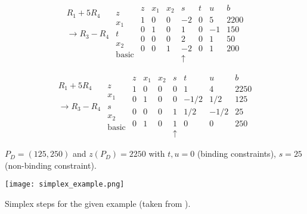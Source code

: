 \documentclass[c]{beamer}
\begin{document}
\begin{frame}
\begin{equation*}
\begin{array}{cc}
&\\
R_1+5R_4&z \\
&x_1 \\
\rightarrow R_3-R_4&t \\
&x_2\\
&\mathrm{basic} \\
\end{array}
\begin{array}{c|ccccc|c}
  z & x_1 & x_2 & s & t & u & b \\ \hline
  1 & 0 & 0 & -2 & 0 & 5 & 2200 \\ \hline
  0 & 1 & 0 & 1 & 0 & -1 & 150  \\
  0 & 0 & 0 & 2 & 0 & 1 & 50 \\
  0 & 0 & 1 & -2 & 0 & 1 & 200 \\
    &  & & \uparrow& & &
\end{array}
\end{equation*}

\begin{equation*}
\begin{array}{cc}
&\\
R_1+5R_4&z \\
&x_1 \\
\rightarrow R_3-R_4&s \\
&x_2\\
&\mathrm{basic} \\
\end{array}
\begin{array}{c|ccccc|c}
  z & x_1 & x_2 & s & t & u & b \\ \hline
  1 & 0 & 0 & 0 & 1 & 4 & 2250 \\ \hline
  0 & 1 & 0 & 0 & -1/2 & 1/2 & 125  \\
  0 & 0 & 0 & 1 & 1/2 & -1/2 & 25 \\
  0 & 1 & 0 & 1 & 0 & 0 & 250 \\
    &  & & \uparrow& & &
\end{array}
\end{equation*}

$\boxed{P_D=(125,250)}$ and $\boxed{z(P_D)=2250}$ with $t,u=0$ (binding constraints), $s=25$ (non-binding constraint).
\end{frame}


\begin{frame}
  \begin{center}
    \texttt{[image: simplex\_example.png]}
  \end{center}
  Simplex steps for the given example (taken from \cite{carter}).
\end{frame}
\end{document}

